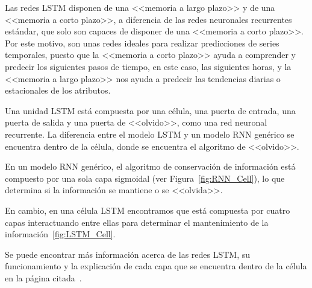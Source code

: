 \par

Las redes LSTM disponen de una <<memoria a largo plazo>> y de una <<memoria a corto plazo>>, a diferencia de las redes neuronales recurrentes estándar, que solo son capaces de disponer de una <<memoria a corto plazo>>. Por este motivo, son unas redes ideales para realizar predicciones de series temporales, puesto que la <<memoria a corto plazo>> ayuda a comprender y predecir los siguientes pasos de tiempo, en este caso, las siguientes horas, y la <<memoria a largo plazo>> nos ayuda a predecir las tendencias diarias o estacionales de los atributos.

\par

Una unidad LSTM está compuesta por una célula, una puerta de entrada, una puerta de salida y una puerta de <<olvido>>, como una red neuronal recurrente. La diferencia entre el modelo LSTM y un modelo RNN genérico se encuentra dentro de la célula, donde se encuentra el algoritmo de <<olvido>>.

\par

En un modelo RNN genérico, el algoritmo de conservación de información está compuesto por una sola capa sigmoidal (ver Figura~\ref{fig:RNN_Cell}), lo que determina si la información se mantiene o se <<olvida>>. 


En cambio, en una célula LSTM encontramos que está compuesta por cuatro capas interactuando entre ellas para determinar el mantenimiento de la información~\ref{fig:LSTM_Cell}.


Se puede encontrar más información acerca de las redes LSTM, su funcionamiento y la explicación de cada capa que se encuentra dentro de la célula en la página citada~\cite{lstm}.